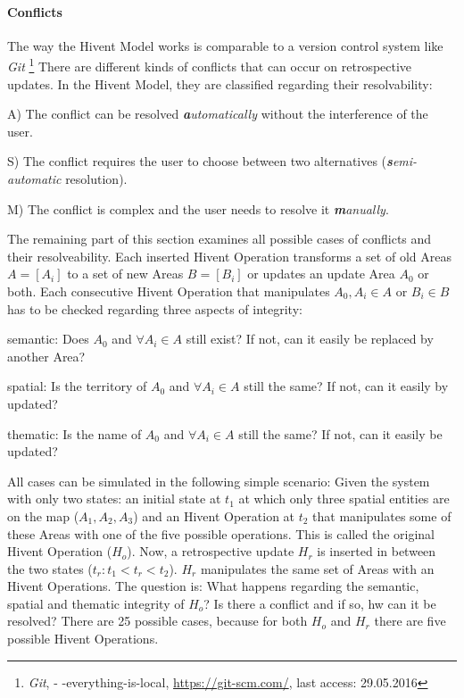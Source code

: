 
\paragraph{Conflicts} %
\label{par:conflicts}

The way the Hivent Model works is comparable to a version control system like \emph{Git}
\footnote{
  \emph{Git},
  - -everything-is-local,
  \url{https://git-scm.com/},
  last access: 29.05.2016
}
There are different kinds of conflicts that can occur on retrospective updates. In the Hivent Model, they are classified regarding their resolvability:

\begin{compactenum}
  \item[A)] The conflict can be resolved \emph{\textbf{a}utomatically} without the interference of the user.
  \item[S)] The conflict requires the user to choose between two alternatives (\emph{\textbf{s}emi-automatic} resolution).
  \item[M)] The conflict is complex and the user needs to resolve it \emph{\textbf{m}anually}.
\end{compactenum}

The remaining part of this section examines all possible cases of conflicts and their resolveability. Each inserted Hivent Operation transforms a set of old Areas $A = [A_i]$ to a set of new Areas $B = [B_i]$ or updates an update Area $A_0$ or both. Each consecutive Hivent Operation that manipulates $A_0, A_i \in A$ or $B_i \in B$ has to be checked regarding three aspects of integrity:

\begin{compactenum}
  \item semantic: Does $A_0$ and $\forall A_i \in A$ still exist? If not, can it easily be replaced by another Area?
  \item spatial: Is the territory of $A_0$ and $\forall A_i \in A$ still the same? If not, can it easily by updated?
  \item thematic: Is the name of $A_0$ and $\forall A_i \in A$ still the same? If not, can it easily be updated?
\end{compactenum}

All cases can be simulated in the following simple scenario: Given the system with only two states: an initial state at $t_1$ at which only three spatial entities are on the map ($A_1, A_2, A_3$) and an Hivent Operation at $t_2$ that manipulates some of these Areas with one of the five possible operations. This is called the original Hivent Operation ($H_o$). Now, a retrospective update $H_r$ is inserted in between the two states ($t_r: t_1 < t_r < t_2$). $H_r$ manipulates the same set of Areas with an Hivent Operations. The question is: What happens regarding the semantic, spatial and thematic integrity of $H_o$? Is there a conflict and if so, hw can it be resolved? There are 25 possible cases, because for both $H_o$ and $H_r$ there are five possible Hivent Operations.

